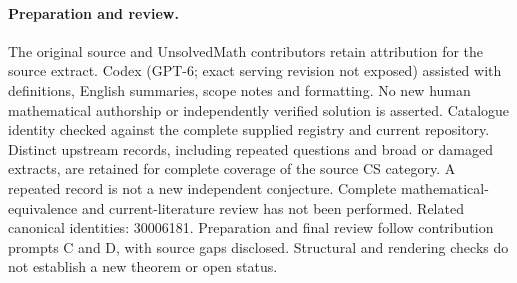 \documentclass[11pt]{article}
\begin{document}
\paragraph{Preparation and review.}
The original source and UnsolvedMath contributors retain attribution for the source extract. Codex (GPT-6; exact serving revision not exposed) assisted with definitions, English summaries, scope notes and formatting. No new human mathematical authorship or independently verified solution is asserted. Catalogue identity checked against the complete supplied registry and current repository. Distinct upstream records, including repeated questions and broad or damaged extracts, are retained for complete coverage of the source CS category. A repeated record is not a new independent conjecture. Complete mathematical-equivalence and current-literature review has not been performed. Related canonical identities: 30006181. Preparation and final review follow contribution prompts C and D, with source gaps disclosed. Structural and rendering checks do not establish a new theorem or open status.
\label{end:statement}
\end{document}
